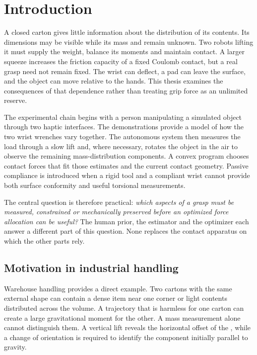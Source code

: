 \chapter{Introduction}
\label{ch:introduction}

A closed carton gives little information about the distribution of its contents. Its dimensions may be visible while its mass and \CoM{} remain unknown. Two robots lifting it must supply the weight, balance its moments and maintain contact. A larger squeeze increases the friction capacity of a fixed Coulomb contact, but a real grasp need not remain fixed. The wrist can deflect, a pad can leave the surface, and the object can move relative to the hands. This thesis examines the consequences of that dependence rather than treating grip force as an unlimited reserve.

The experimental chain begins with a person manipulating a simulated object through two haptic interfaces. The demonstrations provide a model of how the two wrist wrenches vary together. The autonomous system then measures the load through a slow lift and, where necessary, rotates the object in the air to observe the remaining mass-distribution components. A convex program chooses contact forces that fit those estimates and the current contact geometry. Passive compliance is introduced when a rigid tool and a compliant wrist cannot provide both surface conformity and useful torsional measurements.

The central question is therefore practical: \emph{which aspects of a grasp must be measured, constrained or mechanically preserved before an optimized force allocation can be useful?} The human prior, the estimator and the optimizer each answer a different part of this question. None replaces the contact apparatus on which the other parts rely.

\section{Motivation in industrial handling}

Warehouse handling provides a direct example. Two cartons with the same external shape can contain a dense item near one corner or light contents distributed across the volume. A trajectory that is harmless for one carton can create a large gravitational moment for the other. A mass measurement alone cannot distinguish them. A vertical lift reveals the horizontal offset of the \CoM{}, while a change of orientation is required to identify the component initially parallel to gravity.

